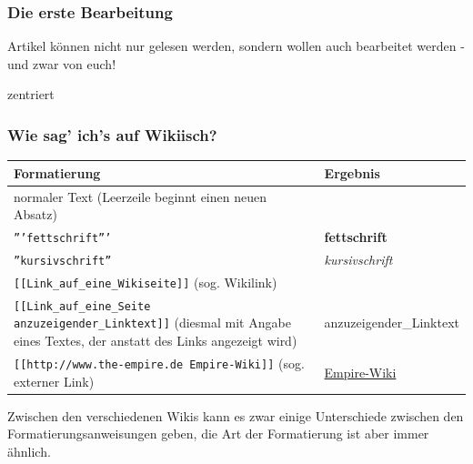 \documentclass{beamer}
\begin{document}
\begin{frame}
  \frametitle{Die erste Bearbeitung}
  Artikel können nicht nur gelesen werden, sondern wollen auch bearbeitet
  werden - und zwar von euch!

  zentriert

\end{frame}

\begin{frame}
  \frametitle{Wie sag’ ich’s auf Wikiisch?}
  \begin{longtable}{|l|l|}
    \hline
    \textbf{Formatierung                                           } & \textbf{Ergebnis                      } \\ 
    \hline
     
    normaler Text (Leerzeile beginnt einen neuen Absatz)             &                                \\ 
    \hline
     
    \texttt{'''fettschrift'''}                                           & \textbf{fettschrift}                \\ 
    \hline
     
    \texttt{''kursivschrift''}                                           & \emph{kursivschrift}                \\ 
    \hline
     
    \texttt{[[Link\_auf\_eine\_Wikiseite]]} (sog. Wikilink)          &     \\ 
    \hline
     
    \texttt{[[Link\_auf\_eine\_Seite anzuzeigender\_Linktext]]} (diesmal mit Angabe eines Textes, der anstatt des Links angezeigt wird)                    &  anzuzeigender\_Linktext \\ 
    \hline
     
    \texttt{[[http://www.the-empire.de Empire-Wiki]]} (sog. externer Link)     & \href{http://www.the-empire.de}{ Empire-Wiki} \\ 
    \hline
     
  \end{longtable}

  Zwischen den verschiedenen Wikis kann es zwar einige Unterschiede zwischen den Formatierungsanweisungen geben, die Art der Formatierung ist aber immer ähnlich.
\end{frame}
\end{document}
